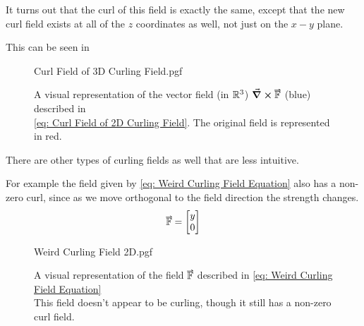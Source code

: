 \documentclass[main.tex]{subfiles}
\begin{document}
                    It turns out that the curl of this field is exactly the same, except that the new curl field exists at all of the $z$ coordinates as well, not just on the $x-y$ plane.

                    This can be seen in 

                    \begin{figure}[h]
                        \centering
                        \scalebox{0.5}
                        {
                            \begin{adjustbox}{clip,trim=150mm 30mm 135mm 30mm}
                                {{Curl Field of 3D Curling Field.pgf}}
                            \end{adjustbox}
                        }
                        \captionsetup{singlelinecheck=off}
                        \caption[.]{A visual representation of the vector field (in $\mathbb{R}^3$) $\protect \curl{\vect{\mathbb{F}}}$ (blue) described in \\\eqref{eq: Curl Field of 2D Curling Field}.  The original field is represented in red.}
                        \label{fig: Curl Field of 3D Curling Field}
                    \end{figure}
                    \FloatBarrier
                    \vspace{1em}


                    There are other types of curling fields as well that are less intuitive.

                    For example the field given by \eqref{eq: Weird Curling Field Equation} also has a non-zero curl, since as we move orthogonal to the field direction the strength changes.
                    \begin{equation}
                        \vect{\mathbb{F}} = \Matrix{y\\0}
                        \label{eq: Weird Curling Field Equation}
                    \end{equation}

                    \begin{figure}[h]
                        \centering
                        \scalebox{0.63}
                        {
                            \begin{adjustbox}{clip,trim=10mm 15mm 10mm 10mm}
                                {{Weird Curling Field 2D.pgf}}
                            \end{adjustbox}
                        }
                        \caption{A visual representation of the field $\protect\vect{\mathbb{F}}$ described in \eqref{eq: Weird Curling Field Equation}\\This field doesn't appear to be curling, though it still has a non-zero curl field.}
                        \label{fig: Weird Curling Field 2D}
                    \end{figure}
                    \FloatBarrier
\end{document}
